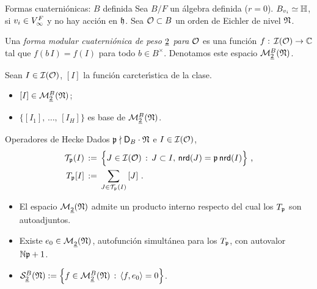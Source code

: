 \begin{frame}{Formas cuaterni\'{o}nicas: $B$ definida}
	Sea $B/F$ un \'{a}lgebra definida ($r=0$). $B_{v_i}\simeq\bb H$, si
	$v_i\in\lugares[\infty]{F}$ y no hay acci\'{o}n en $\hP$.
	Sea $\cal O\subset B$ un orden de Eichler de nivel $\frak N$.

	\begin{defCuaternionicas}\label{def:cuaternionicasdef}
		Una \emph{forma modular cuaterni\'{o}nica de peso $\peso 2$ %
		para $\cal O$} es una funci\'{o}n
		$f:\,\ideales{\cal O}\rightarrow\bb C$ tal que $f(b\,I)=f(I)$
		para todo $b\in B^\times$. Denotamos este espacio
		$\modularH[B]2{\frak N}$.
	\end{defCuaternionicas}

	\begin{obsCuaternionicas}\label{obs:cuaternionicasdef}
		Sean $I\in\ideales{\cal O}$, $[I]$ la funci\'{o}n
		carcter\'{\i}stica de la clase.
		\begin{itemize}
			\item $[I]\in\modularH[B]2{\frak N}$;
			\item $\{[I_1],\,\dots,\,[I_H]\}$ es base de
				$\modularH[B]2{\frak N}$.
		\end{itemize}
	\end{obsCuaternionicas}
\end{frame}

\begin{frame}{Operadores de Hecke}
	Dados $\frak p\nmid\disc[B]\cdot\frak N$ e $I\in\ideales{\cal O}$,
	\begin{align*}
		\cal T_{\frak p}(I) & \,:=\,
			\Big\{J\in\ideales{\cal O}\,:\,J\subset I,\,
				\nrd(J)=\frak p\,\nrd(I)\Big\}
			\text{ ,} \\
		T_{\frak p}[I] & \,:=\,\sum_{J\in\cal T_{\frak p}(I)}\,
			[J]
		\text{ .}
	\end{align*}
	\begin{itemize}
		\item El espacio $\modularH2{\frak N}$ admite un producto
			interno respecto del cual los $T_{\frak p}$ son
			autoadjuntos.
		\item Existe $e_0\in\modularH2{\frak N}$, autofunci\'{o}n
			simult\'{a}nea para los $T_{\frak p}$, con autovalor
			$\idnorm\frak p+1$.
		\item
			\begin{math}
				\spitzH[B]2{\frak N}:=
					\Big\{f\in\modularH[B]2{\frak N}\,:\,
					\langle f,e_0\rangle=0\Big\}
			\end{math}.
	\end{itemize}
\end{frame}


